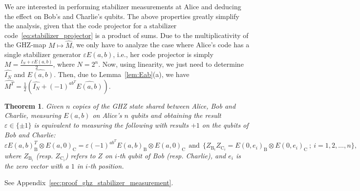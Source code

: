 \documentclass[journal,onecolumn]{IEEEtran}
\newtheorem{theorem}{Theorem}
\newcommand{\ghzmap}[1]{\widehat{#1}}
\begin{document}
We are interested in performing stabilizer measurements at Alice and deducing the effect on Bob's and Charlie's qubits.
The above properties greatly simplify the analysis, given that the code projector for a stabilizer code~\eqref{eq:stabilizer_projector} is a product of sums.
Due to the multiplicativity of the GHZ-map $M \mapsto \ghzmap{M}$, we only have to analyze the case where Alice's code has a single stabilizer generator $\varepsilon E(a,b)$, i.e., her code projector is simply $M = \frac{I_N + \varepsilon E(a,b)}{2}$, where $N = 2^n$.
Now, using linearity, we just need to determine $\ghzmap{I_N}$ and $\ghzmap{E(a,b)}$.
Then, due to Lemma~\ref{lem:Eab}(a), we have $\ghzmap{M^T} = \frac{1}{2} \left( \ghzmap{I_N} + (-1)^{ab^T} \ghzmap{E(a,b)} \right)$.





\begin{theorem}
\label{thm:ghz_stabilizer_measurement}
Given $n$ copies of the GHZ state shared between Alice, Bob and Charlie, measuring $E(a,b)$ on Alice's $n$ qubits and obtaining the result $\varepsilon \in \{ \pm 1 \}$ is equivalent to measuring the following with results $+1$ on the qubits of Bob and Charlie: 
\[ \varepsilon E(a,b)_{\text{B}}^T \otimes E(a,0)_{\text{C}} = \varepsilon (-1)^{ab^T} E(a,b)_{\text{B}} \otimes E(a,0)_{\text{C}} \ \ \text{and} \ \ \{ Z_{\text{B}_i} Z_{\text{C}_i} = E(0,e_i)_{\text{B}} \otimes E(0,e_i)_{\text{C}} \ ; \ i = 1,2,\ldots,n \}, \]
where $Z_{\text{B}_i}$ (resp. $Z_{\text{C}_i}$) refers to $Z$ on $i$-th qubit of Bob (resp. Charlie), and $e_i$ is the zero vector with a $1$ in $i$-th position.
\end{theorem}
\begin{IEEEproof}
See Appendix~\ref{sec:proof_ghz_stabilizer_measurement}.
\end{IEEEproof}
\end{document}
